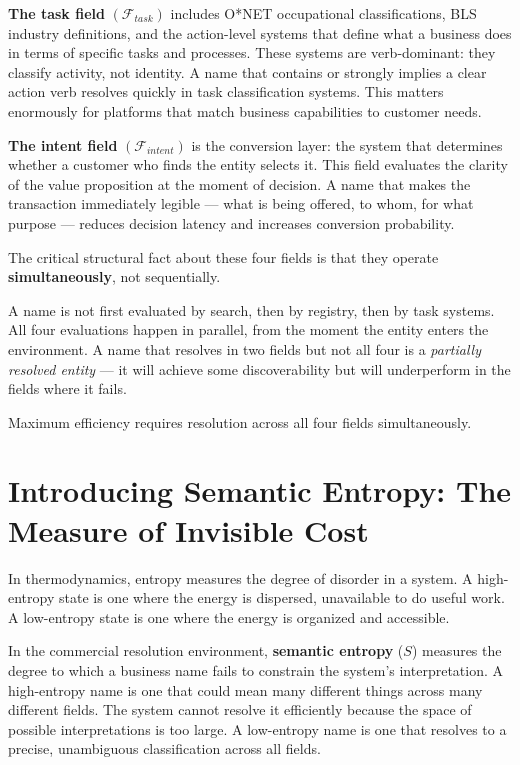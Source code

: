 \documentclass[12pt, openany]{book}
\theoremstyle{thmstyle}
\theoremstyle{defstyle}
\begin{document}
\textbf{The task field} $(\mathcal{F}_{task})$ includes O*NET occupational classifications, BLS industry definitions, and the action-level systems that define what a business does in terms of specific tasks and processes. These systems are verb-dominant: they classify activity, not identity. A name that contains or strongly implies a clear action verb resolves quickly in task classification systems. This matters enormously for platforms that match business capabilities to customer needs.

\textbf{The intent field} $(\mathcal{F}_{intent})$ is the conversion layer: the system that determines whether a customer who finds the entity selects it. This field evaluates the clarity of the value proposition at the moment of decision. A name that makes the transaction immediately legible --- what is being offered, to whom, for what purpose --- reduces decision latency and increases conversion probability.

\vspace{8pt}

The critical structural fact about these four fields is that they operate \textbf{simultaneously}, not sequentially.

A name is not first evaluated by search, then by registry, then by task systems. All four evaluations happen in parallel, from the moment the entity enters the environment. A name that resolves in two fields but not all four is a \textit{partially resolved entity} --- it will achieve some discoverability but will underperform in the fields where it fails.

Maximum efficiency requires resolution across all four fields simultaneously.

\section{Introducing Semantic Entropy: The Measure of Invisible Cost}

In thermodynamics, entropy measures the degree of disorder in a system. A high-entropy state is one where the energy is dispersed, unavailable to do useful work. A low-entropy state is one where the energy is organized and accessible.

In the commercial resolution environment, \textbf{semantic entropy} ($S$) measures the degree to which a business name fails to constrain the system's interpretation. A high-entropy name is one that could mean many different things across many different fields. The system cannot resolve it efficiently because the space of possible interpretations is too large. A low-entropy name is one that resolves to a precise, unambiguous classification across all fields.
\end{document}
